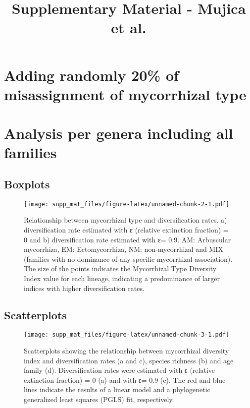 \documentclass[]{article}
\title{Supplementary Material - Mujica et al.}
\author{}
\date{}
\begin{document}
\maketitle

\hypertarget{adding-randomly-20-of-misassignment-of-mycorrhizal-type}{%
\section{Adding randomly 20\% of misassignment of mycorrhizal
type}\label{adding-randomly-20-of-misassignment-of-mycorrhizal-type}}

\hypertarget{analysis-per-genera-including-all-families}{%
\section{Analysis per genera including all
families}\label{analysis-per-genera-including-all-families}}

\hypertarget{boxplots}{%
\subsection{Boxplots}\label{boxplots}}

\begin{figure}
\centering
\texttt{[image: supp\_mat\_files/figure-latex/unnamed-chunk-2-1.pdf]}
\caption{Relationship between mycorrhizal type and diversification
rates. a) diversification rate estimated with ε (relative extinction
fraction) = 0 and b) diversification rate estimated with ε= 0.9. AM:
Arbuscular mycorrhiza, EM: Ectomycorrhiza, NM: non-mycorrhizal and MIX
(families with no dominance of any specific mycorrhizal association).
The size of the points indicates the Mycorrhizal Type Diversity Index
value for each lineage, indicating a predominance of larger indices with
higher diversification rates.}
\end{figure}

\hypertarget{scatterplots}{%
\subsection{Scatterplots}\label{scatterplots}}

\begin{figure}
\centering
\texttt{[image: supp\_mat\_files/figure-latex/unnamed-chunk-3-1.pdf]}
\caption{Scatterplots showing the relationship between mycorrhizal
diversity index and diversification rates (a and c), species richness
(b) and age family (d). Diversification rates were estimated with ε
(relative extinction fraction) = 0 (a) and with ε= 0.9 (c). The red and
blue lines indicate the results of a linear model and a phylogenetic
generalized least squares (PGLS) fit, respectively.}
\end{figure}
\end{document}
